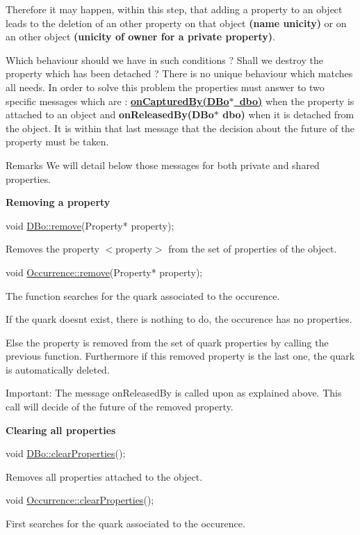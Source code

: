 Therefore it may happen, within this step, that adding a property to an object leads to the deletion of an other property on that object {\bfseries (name unicity)} or on an other object {\bfseries (unicity of owner for a private property)}.

Which behaviour should we have in such conditions ? Shall we destroy the property which has been detached ? There is no unique behaviour which matches all needs. In order to solve this problem the properties must answer to two specific messages which are \+: {\bfseries \mbox{\hyperlink{classHurricane_1_1Property_ac7b936414d9d85bb6509100b5dd6a667}{on\+Captured\+By(\+D\+Bo$\ast$ dbo)}}} when the property is attached to an object and {\bfseries on\+Released\+By(D\+Bo$\ast$ dbo)} when it is detached from the object. It is within that last message that the decision about the future of the property must be taken.

\begin{DoxyRemark}{Remarks}
We will detail below those messages for both private and shared properties.
\end{DoxyRemark}
{\bfseries Removing a property} 
\begin{DoxyCode}
\textcolor{keywordtype}{void} \mbox{\hyperlink{classHurricane_1_1DBo_a7833a1f0b8c704930bdc00861e63cf5e}{DBo::remove}}(Property* property);
\end{DoxyCode}
 Removes the property {\ttfamily $<$property$>$} from the set of properties of the object. 
\begin{DoxyCode}
\textcolor{keywordtype}{void} \mbox{\hyperlink{classHurricane_1_1Occurrence_a774404aa5eb01371f64cf5fda3f3ffbf}{Occurrence::remove}}(Property* property);
\end{DoxyCode}
 The function searches for the quark associated to the occurence.

If the quark doesn\textquotesingle{}t exist, there is nothing to do, the occurence has no properties.

Else the property is removed from the set of quark properties by calling the previous function. Furthermore if this removed property is the last one, the quark is automatically deleted.

\begin{DoxyParagraph}{Important\+: The message on\+Released\+By is called upon as explained }
above. This call will decide of the future of the removed property.
\end{DoxyParagraph}
{\bfseries Clearing all properties} 
\begin{DoxyCode}
\textcolor{keywordtype}{void} \mbox{\hyperlink{classHurricane_1_1DBo_a3e02f3d665cb0b2120df2fdfe9c3df4f}{DBo::clearProperties}}();
\end{DoxyCode}
 Removes all properties attached to the object. 
\begin{DoxyCode}
\textcolor{keywordtype}{void} \mbox{\hyperlink{classHurricane_1_1Occurrence_ae9b269d39f3f68645d6d396d7ab5d8b7}{Occurrence::clearProperties}}();
\end{DoxyCode}
 First searches for the quark associated to the occurence.

